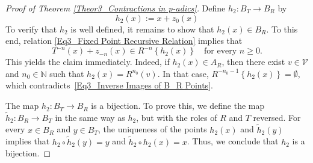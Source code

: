 \documentclass[a4paper, 12pt]{article}
\theoremstyle{definition}
\begin{document}
\begin{proof}[Proof of Theorem \ref{Theor3_Contractions in p-adics}]
		
		
		Define $h_{2}: B_{T} \to B_{R}$ by  
		\begin{equation}\label{Eq2_Conjugation Fundamental Domain B}
			h_{2} \left(  x  \right)  :=   x + z_{0} \left(  x  \right)  
		\end{equation}
		To verify that $h_{2}$ is well defined, it remains to show that $h_{2} \left(  x  \right)  \in B_{R}$. To this end, relation \eqref{Eq3_Fixed Point Recursive Relation} implies that 
		\begin{equation}\label{Eq3_Inverse Images of B_R Points}
			T^{-n} \left(  x  \right)  + z_{-n} \left(  x  \right)    \in   R^{-n} \left\{  h_{2}  \left(  x  \right)   \right\}  \quad \text{for every } n \ge 0 .
		\end{equation} 
		This yields the claim immediately. Indeed, if $ h_{2}(x) \in A_{R}$, then there exist $v \in \mathcal{V}$ and $n_{0} \in \mathbb{N} $ such that $ h_{2}(x) = R^{n_{0}}(v)$. 
		In that case, $R^{-n_{0} -1 } \left\{   h_{2}(x)  \right\}  = \emptyset$, which contradicts~\eqref{Eq3_Inverse Images of B_R Points}. 
		
		
		
		
		The map $h_{2}: B_{T} \to B_{R}$ is a bijection. To prove this, we define the map $\tilde{h}_{2}: B_{R} \to B_{T}$ in the same way as $h_{2}$, but with the roles of $R$ and $T$ reversed. 
		For every $x \in B_{R}$ and $y \in B_{T}$, the uniqueness of the points $h_{2} \left(  x  \right) $ and $\tilde{h}_{2} \left(  y  \right) $ implies that  $h_{2} \circ \tilde{h}_{2} \left(  y  \right)  = y$ and $\tilde{h}_{2} \circ h_{2} \left(  x  \right)   = x$. Thus, we conclude that $h_{2}$ is a bijection. 
		

\end{proof}
\end{document}
